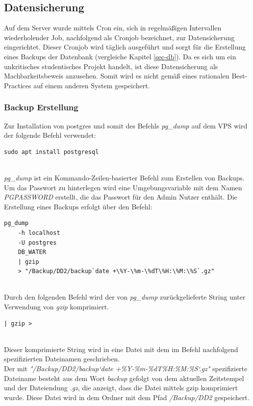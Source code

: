 \subsection{Datensicherung}
Auf dem Server wurde mittels Cron \cite{crontab} ein, sich in regelmäßigen Intervallen wiederholender Job, nachfolgend als 
Cronjob bezeichnet, zur Datensicherung eingerichtet. Dieser Cronjob wird täglich ausgeführt und sorgt für die Erstellung 
eines Backups der Datenbank (vergleiche Kapitel \ref{sec-db}). Da es sich um ein unkritisches studentisches Projekt handelt, 
ist diese Datensicherung als Machbarkeitsbeweis anzusehen. Somit wird es nicht gemäß eines 
rationalen Best-Practices auf einem anderen System gespeichert. 

\subsubsection{Backup Erstellung}
Zur Installation von postgres \cite{postgresql} und somit des Befehls \textit{pg\_dump} auf dem VPS wird der 
folgende Befehl verwendet:
~\\\begin{lstlisting}[caption={Befehl zum Installieren von PostgreSQL}, captionpos=b, label={fig:PostgreSQL Installation}]
sudo apt install postgresql
\end{lstlisting}
~\\ \textit{pg\_dump} ist ein Kommando-Zeilen-basierter Befehl zum Erstellen von Backups. 
Um das Passwort zu hinterlegen wird eine Umgebungsvariable mit dem Namen \textit{PGPASSWORD} 
erstellt, die das Passwort für den Admin Nutzer enthält. Die Erstellung eines Backups erfolgt über den Befehl: 
~\\\begin{lstlisting}[caption={Backup Befehl}, captionpos=b, label={fig:Backup Command}]
pg_dump 
    -h localhost 
    -U postgres 
    DB_WATER 
    | gzip 
    > "/Backup/DD2/backup`date +\%Y-\%m-\%dT\%H:\%M:\%S`.gz"
\end{lstlisting}
~\\Durch den folgenden Befehl wird der von \textit{pg\_dump} zurückgelieferte String unter 
Verwendung von \textit{gzip} komprimiert. 
~\\\begin{lstlisting}[caption={Komprimieren des Backups}, captionpos=b, label={fig:gzip pipe}]
    | gzip > 
\end{lstlisting}
~\\ Dieser komprimierte String wird in eine Datei mit dem im Befehl nachfolgend spezifizierten 
Dateinamen geschrieben. \\
Der mit \textit{"/Backup/DD2/backup`date +\%Y-\%m-\%dT\%H:\%M:\%S`.gz"} spezifizierte Dateiname 
besteht aus dem Wort \textit{backup} gefolgt von dem aktuellen Zeitstempel und der Dateiendung 
\textit{.gz}, die anzeigt, dass die Datei mittels gzip komprimiert wurde. Diese Datei wird in 
dem Ordner mit dem Pfad \textit{/Backup/DD2} gespeichert.

